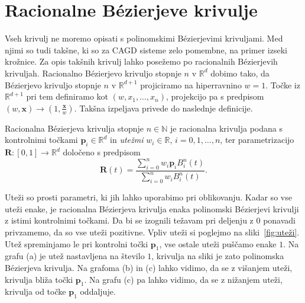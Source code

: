 \documentclass[isrm2, tisk]{fmfdelo}
\newcommand{\R}{\mathbb R}
\newcommand{\N}{\mathbb N}
\newcommand{\p}{\mathbf{p}}
\begin{document}
    \section{Racionalne Bézierjeve krivulje}
    Vseh krivulj ne moremo opisati s polinomskimi Bézierjevimi krivuljami.
    Med njimi so tudi takšne, ki so za CAGD sisteme zelo pomembne, na primer izseki krožnice.
    Za opis takšnih krivulj lahko posežemo po racionalnih Bézierjevih krivuljah.
    Racionalno Bézierjevo krivuljo stopnje $n$ v $\R^d$ dobimo tako, da Bézierjevo krivuljo stopnje $n$ v $\R^{d+1}$ projiciramo na hiperravnino $w=1$.
    Točke iz $\R^{d+1}$ pri tem definiramo kot $(w,x_1,\ldots,x_n)$, projekcijo pa s predpisom $(w,\mathbf{x})\to(1,\frac{\mathbf{x}}{w})$.
    Takšna izpeljava privede do naslednje definicije.
    \begin{definicija}
        \label{def:racionalna}
        Racionalna Bézierjeva krivulja stopnje $n\in\N$ je racionalna krivulja podana s kontrolnimi točkami $\p_i\in\R^d$ in \textit{utežmi} $w_i\in\R$, $i=0,1,\ldots,n$, ter parametrizacijo $\mathbf{R}:[0,1]\to \R^d$  določeno s predpisom \[\mathbf{R}(t) = \frac{\sum^{n}_{i=0}w_i\p_i B^n_i(t)}{\sum^{n}_{i=0}w_i B^n_i(t)}.\]
    \end{definicija}
    \noindent Uteži so prosti parametri, ki jih lahko uporabimo pri oblikovanju.
    Kadar so vse uteži enake, je racionalna Bézierjeva krivulja enaka polinomski Bézierjevi krivulji z istimi kontrolnimi točkami.
    Da bi se izognili težavam pri deljenju z $0$ ponavadi privzamemo, da so vse uteži pozitivne.
    Vpliv uteži si poglejmo na sliki~\ref{fig:uteži}.
    Utež spreminjamo le pri kontrolni točki $\p_1$, vse ostale uteži puščamo enake $1$.
    Na grafu (a) je utež nastavljena na število $1$, krivulja na sliki je zato polinomska Bézierjeva krivulja.
    Na grafoma (b) in (c) lahko vidimo, da se z višanjem uteži, krivulja bliža točki $\p_1$.
    Na grafu (c) pa lahko vidimo, da se z nižanjem uteži, krivulja od točke $\p_1$ oddaljuje.
\end{document}
